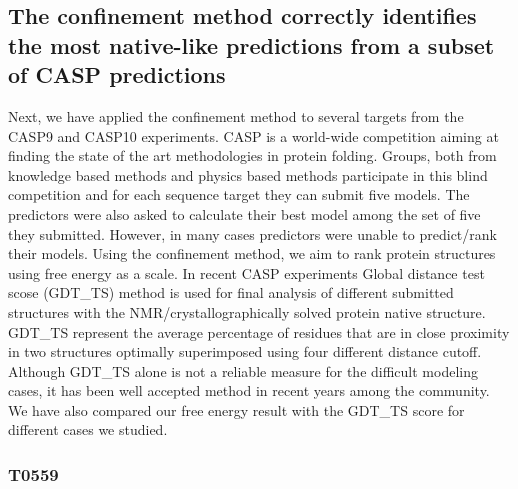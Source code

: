 \documentclass[12pt]{article}
\begin{document}
\subsection{The confinement method correctly identifies the most native-like predictions from a
subset of CASP predictions}

Next, we have applied the confinement method to several targets from the CASP9 and CASP10
experiments. CASP is a world-wide competition aiming at finding the state of the art methodologies
in protein folding. Groups, both from knowledge based methods and physics based methods participate
in this blind competition and for each sequence target they can submit five models. The predictors
were also asked to calculate their best model among the set of five they submitted. However, in many
cases predictors were unable to predict/rank their models. Using the confinement method, we aim to
rank protein structures using free energy as a scale. In recent CASP experiments Global distance
test scose (GDT\_TS) method is used for final analysis of different submitted structures with the
NMR/crystallographically solved protein native structure. GDT\_TS represent the average percentage
of residues that are in close proximity in two structures optimally superimposed using four
different distance cutoff. Although GDT\_TS alone is not a reliable measure for the difficult
modeling cases, it has been well accepted method in recent years among the community. We have also
compared our free energy result with the GDT\_TS score for different cases we studied.



\subsubsection{T0559}
\end{document}
